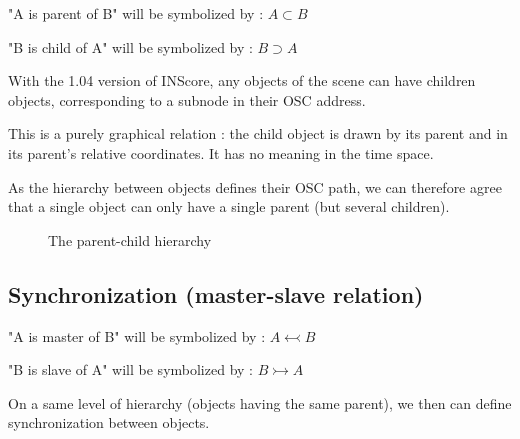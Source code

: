 \documentclass[a4paper]{article}
\begin{document}
"A is parent of B" will be symbolized by : $A \subset B$

"B is child of A" will be symbolized by : $B \supset A$

\bigskip

With the 1.04 version of INScore, any objects of the scene can have children objects, corresponding to a subnode in their OSC address. 

This is a purely graphical relation : the child object is drawn by its parent and in its parent's relative coordinates. It has no meaning in the time space. 

As the hierarchy between objects defines their OSC path, we can therefore agree that a single object can only have a single parent (but several children). 

\bigskip

\begin{figure}[h]


 \caption{The parent-child hierarchy}
 \label{fig:hierarchy}

\end{figure}

\subsection{Synchronization (master-slave relation)}\label{subsec:sync}

"A is master of B" will be symbolized by : $A \leftarrowtail B$

"B is slave of A" will be symbolized by : $B \rightarrowtail A$
\bigskip

On a same level of hierarchy (objects having the same parent), we then can define synchronization between objects. 
\end{document}
